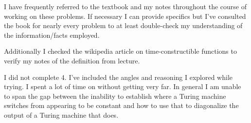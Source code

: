 \documentclass[usletter]{article}
\begin{document}

I have frequently referred to the textbook \cite{textbook} and my notes throughout the course of working on these problems. If necessary I can provide specifics but I've consulted the book for nearly every problem to at least double-check my understanding of the information/facts employed.

Additionally I checked the wikipedia article on time-constructible functions \cite{wikipedia} to verify my notes of the definition from lecture.

I did not complete 4. I've included the angles and reasoning I explored while trying. I spent a lot of time on without getting very far. In general I am unable to span the gap between the inability to establish where a Turing machine switches from appearing to be constant and how to use that to diagonalize the output of a Turing machine that does.
\end{document}
